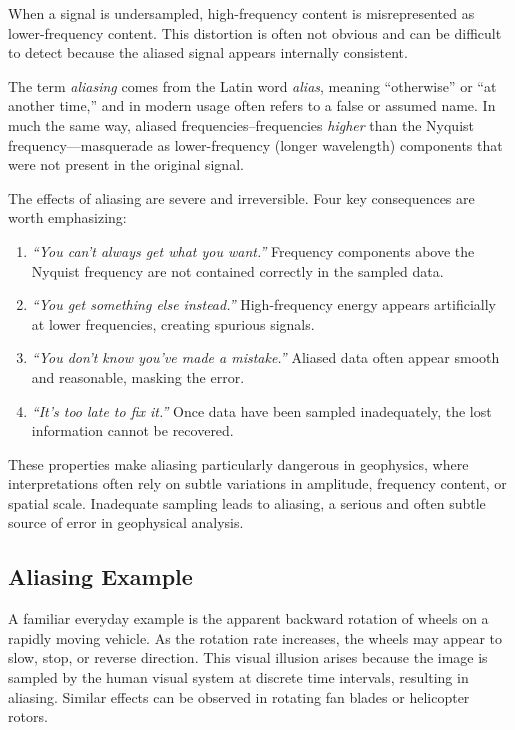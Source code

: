 When a signal is undersampled, high-frequency content is misrepresented as lower-frequency content. This distortion is often not obvious and can be difficult to detect because the aliased signal appears internally consistent.

The term \emph{aliasing} comes from the Latin word \emph{alias}, meaning ``otherwise'' or ``at another time,'' and in modern usage often refers to a false or assumed name. In much the same way, aliased frequencies--frequencies \emph{higher} than the Nyquist frequency---masquerade as lower-frequency (longer wavelength) components that were not present in the original signal.

The effects of aliasing are severe and irreversible. Four key consequences are worth emphasizing:
\begin{enumerate}
  \item \textit{``You can't always get what you want.''} Frequency components above the Nyquist frequency are not contained correctly in the sampled data.
  \item \textit{``You get something else instead.''} High-frequency energy appears artificially at lower frequencies, creating spurious signals.
  \item \textit{``You don't know you've made a mistake.''} Aliased data often appear smooth and reasonable, masking the error.
  \item \textit{``It's too late to fix it.''} Once data have been sampled inadequately, the lost information cannot be recovered.
\end{enumerate}

These properties make aliasing particularly dangerous in geophysics, where interpretations often rely on subtle variations in amplitude, frequency content, or spatial scale.  Inadequate sampling leads to aliasing, a serious and often subtle source of error in geophysical analysis.

\subsection{Aliasing Example}

A familiar everyday example is the apparent backward rotation of wheels on a rapidly moving vehicle. As the rotation rate increases, the wheels may appear to slow, stop, or reverse direction. This visual illusion arises because the image is sampled by the human visual system at discrete time intervals, resulting in aliasing. Similar effects can be observed in rotating fan blades or helicopter rotors.


